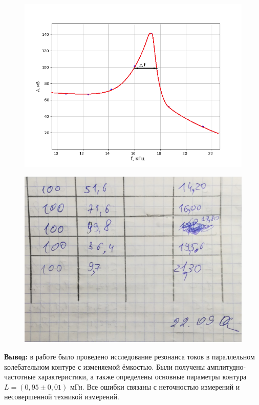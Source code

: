 \documentclass[a4paper,12pt]{article} %
\begin{document}
\begin{figure}[h!]
	\centering
	\includegraphics[scale=0.85]{Pictures/Рез2Добр.png}
\end{figure}
\newpage
\begin{figure}[h!]
	\centering
	\includegraphics[scale=0.25]{Pictures/Табл.jpg}
\end{figure}

\textbf{Вывод:} в работе было проведено исследование резонанса токов в параллельном колебательном контуре с изменяемой ёмкостью. Были получены амплитудно-частотные характеристики, а также определены основные параметры контура $L = (0,95 \pm 0,01)$ мГн. Все ошибки связаны с неточностью измерений и несовершенной техникой измерений.
\end{document}
